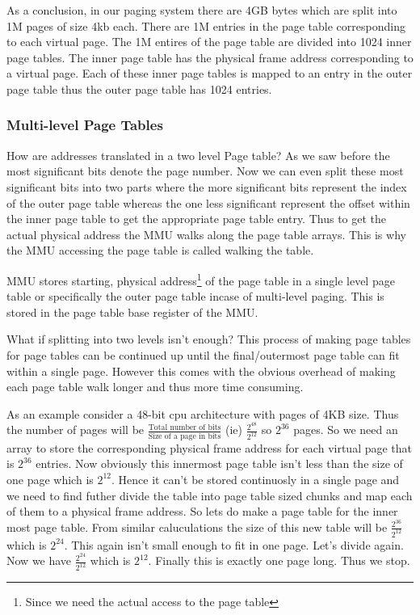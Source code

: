 \documentclass[12pt]{article}
\newcommand{\tbox}[1]{\noindent\fbox{\parbox{\textwidth}{#1}}}
\begin{document}
As a conclusion, in our paging system there are 4GB bytes which are split into 1M pages of size 4kb each. There are 1M entries in the page table corresponding to each virtual page. The 1M entires of the page table are divided into 1024 inner page tables.
The inner page table has the physical frame address corresponding to a virtual page. Each of these inner page tables is mapped to an entry in the outer page table thus the outer page table has 1024 entries.



\subsubsection{Multi-level Page Tables}
How are addresses translated in a two level Page table? As we saw before the most significant bits denote the page number. Now we can even split these most
significant bits into two parts where the more significant bits represent the index of the outer page table whereas the one less significant represent the offset within the inner page table to get the appropriate page table entry. Thus to get the actual 
physical address the MMU walks along the page table arrays. This is why the MMU accessing the page table is called walking the table. 


MMU stores starting, physical address\footnote{Since we need the actual access to the page table} of the page table in a single level page table or specifically the outer page table incase of multi-level paging. 
This is stored in the page table base register of the MMU.

What if splitting into two levels isn't enough? This process of making page tables for page tables can be continued up until the final/outermost page table can fit within a single page. 
However this comes with the obvious overhead of making each page table walk longer and thus more time consuming. 

\newpage
\noindent\tbox{
    \begin{center}
    \textbf{\Huge Lecture 15}\\
    \end{center}
}


As an example consider a 48-bit cpu architecture with pages of 4KB size. Thus the number of pages will be \(\frac{\text{Total number of bits}}{\text{Size of a page in bits}}\) (ie) \(\frac{2^{48}}{2^{12}}\) so \(2^{36}\) pages. So we need an array to store the corresponding 
physical frame address for each virtual page that is \(2^{36}\) entries. Now obviously this innermost page table isn't less than the size of one page which is \(2^{12}\). Hence it can't be stored continuosly in a single page and we need to find futher divide the table into page table sized chunks and map each of them to a physical frame address.
So lets do make a page table for the inner most page table. From similar caluculations the size of this new table will be \(\frac{2^{36}}{2^{12}}\) which is \(2^{24}\). This again isn't small enough to fit in one page. Let's divide again. Now we have \(\frac{2^{24}}{2^{12}}\) which is \(2^{12}\). Finally this is exactly one page long.
Thus we stop.
\end{document}
